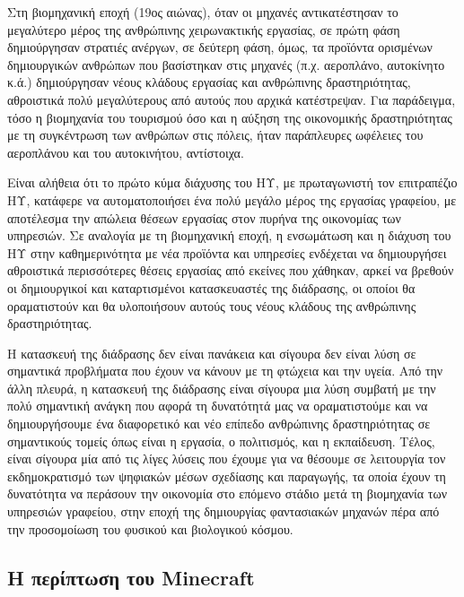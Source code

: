 \documentclass[
]{article}
\begin{document}
Στη βιομηχανική εποχή (19ος αιώνας), όταν οι μηχανές αντικατέστησαν το
μεγαλύτερο μέρος της ανθρώπινης χειρωνακτικής εργασίας, σε πρώτη φάση
δημιούργησαν στρατιές ανέργων, σε δεύτερη φάση, όμως, τα προϊόντα
ορισμένων δημιουργικών ανθρώπων που βασίστηκαν στις μηχανές (π.χ.
αεροπλάνο, αυτοκίνητο κ.ά.) δημιούργησαν νέους κλάδους εργασίας και
ανθρώπινης δραστηριότητας, αθροιστικά πολύ μεγαλύτερους από αυτούς που
αρχικά κατέστρεψαν. Για παράδειγμα, τόσο η βιομηχανία του τουρισμού όσο
και η αύξηση της οικονομικής δραστηριότητας με τη συγκέντρωση των
ανθρώπων στις πόλεις, ήταν παράπλευρες ωφέλειες του αεροπλάνου και του
αυτοκινήτου, αντίστοιχα.

Είναι αλήθεια ότι το πρώτο κύμα διάχυσης του ΗΥ, με πρωταγωνιστή τον
επιτραπέζιο ΗΥ, κατάφερε να αυτοματοποιήσει ένα πολύ μεγάλο μέρος της
εργασίας γραφείου, με αποτέλεσμα την απώλεια θέσεων εργασίας στον πυρήνα
της οικονομίας των υπηρεσιών. Σε αναλογία με τη βιομηχανική εποχή, η
ενσωμάτωση και η διάχυση του ΗΥ στην καθημερινότητα με νέα προϊόντα και
υπηρεσίες ενδέχεται να δημιουργήσει αθροιστικά περισσότερες θέσεις
εργασίας από εκείνες που χάθηκαν, αρκεί να βρεθούν οι δημιουργικοί και
καταρτισμένοι κατασκευαστές της διάδρασης, οι οποίοι θα οραματιστούν και
θα υλοποιήσουν αυτούς τους νέους κλάδους της ανθρώπινης δραστηριότητας.

Η κατασκευή της διάδρασης δεν είναι πανάκεια και σίγουρα δεν είναι λύση
σε σημαντικά προβλήματα που έχουν να κάνουν με τη φτώχεια και την υγεία.
Από την άλλη πλευρά, η κατασκευή της διάδρασης είναι σίγουρα μια λύση
συμβατή με την πολύ σημαντική ανάγκη που αφορά τη δυνατότητά μας να
οραματιστούμε και να δημιουργήσουμε ένα διαφορετικό και νέο επίπεδο
ανθρώπινης δραστηριότητας σε σημαντικούς τομείς όπως είναι η εργασία, ο
πολιτισμός, και η εκπαίδευση. Τέλος, είναι σίγουρα μία από τις λίγες
λύσεις που έχουμε για να θέσουμε σε λειτουργία τον εκδημοκρατισμό των
ψηφιακών μέσων σχεδίασης και παραγωγής, τα οποία έχουν τη δυνατότητα να
περάσουν την οικονομία στο επόμενο στάδιο μετά τη βιομηχανία των
υπηρεσιών γραφείου, στην εποχή της δημιουργίας φαντασιακών μηχανών πέρα
από την προσομοίωση του φυσικού και βιολογικού κόσμου.

\hypertarget{ux3b7-ux3c0ux3b5ux3c1ux3afux3c0ux3c4ux3c9ux3c3ux3b7-ux3c4ux3bfux3c5-minecraft}{%
\subsection{Η περίπτωση του
Minecraft}\label{ux3b7-ux3c0ux3b5ux3c1ux3afux3c0ux3c4ux3c9ux3c3ux3b7-ux3c4ux3bfux3c5-minecraft}}
\end{document}
